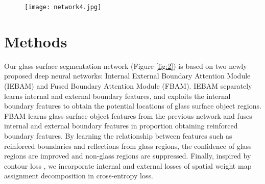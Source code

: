 \documentclass[10pt,twocolumn,letterpaper]{article}
\begin{document}
\begin{figure*}[t!]
\centering
\begin{subfigure}{\linewidth}
\centering
\texttt{[image: network4.jpg]}
\end{subfigure}
\caption{The pipeline of our proposed network. It can be observed that with the ASPP structure, our baseline is DeeplabV3+, and we connect our IEBAM and FBAM in a cascaded order.}
\label{fig:2}
\end{figure*}
\section{Methods}
\label{sec:formatting}
Our glass surface segmentation network (Figure \ref{fig:2}) is based on two newly proposed deep neural networks: Internal External Boundary Attention Module (IEBAM) and Fused Boundary Attention Module (FBAM). IEBAM separately learns internal and external boundary features, and exploits the internal boundary features to obtain the potential locations of glass surface object regions. FBAM learns glass surface object features from the previous network and fuses internal and external boundary features in proportion obtaining reinforced boundary features. By learning the relationship between features such as reinforced boundaries and reflections from glass regions, the confidence of glass regions are improved and non-glass regions are suppressed. Finally, inspired by contour loss \cite{chen2020contour}, we incorporate internal and external losses of spatial weight map assignment decomposition in cross-entropy loss.
\end{document}
